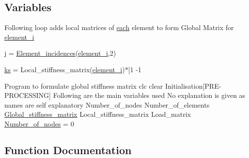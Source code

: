 \subsection*{Variables}
\begin{DoxyCompactItemize}
\item 
Following loop adds local matrices of \hyperlink{a00030_a18d9b499a0765bf2fe5f372ff2fc0236}{each} element to form Global Matrix for \hyperlink{a00007_aeaaf98952d2cff93963f1287282861de}{element\+\_\+i}
\item 
\hyperlink{a00007_abf2bc2545a4a5f5683d9ef3ed0d977e0}{j} = \hyperlink{a00007_aba5eae545abb25c91b167b9fcdf95479}{Element\+\_\+incidences}(\hyperlink{a00007_aeaaf98952d2cff93963f1287282861de}{element\+\_\+i},2)
\item 
\hyperlink{a00007_a0b4fbdd467cb846f22c44ad1178c22d4}{ks} = Local\+\_\+stiffness\+\_\+matrix(\hyperlink{a00007_aeaaf98952d2cff93963f1287282861de}{element\+\_\+i})$\ast$\mbox{[}1 -\/1
\item 
Program to formulate global stiffness matrix clc clear Initialisation\mbox{[}P\+R\+E-\/P\+R\+O\+C\+E\+S\+S\+I\+N\+G\mbox{]} Following are the main variables used No explanation is given as names are self explanatory Number\+\_\+of\+\_\+nodes Number\+\_\+of\+\_\+elements \hyperlink{a00008_a9476fe4c830b643fa299df9ac0058700}{Global\+\_\+stiffness\+\_\+matrix} Local\+\_\+stiffness\+\_\+matrix Load\+\_\+matrix \hyperlink{a00007_a1d65c23ed4744bf98747671b08490b5c}{Number\+\_\+of\+\_\+nodes} = 0
\end{DoxyCompactItemize}


\subsection{Function Documentation}
\hypertarget{a00007_aba5eae545abb25c91b167b9fcdf95479}{}

